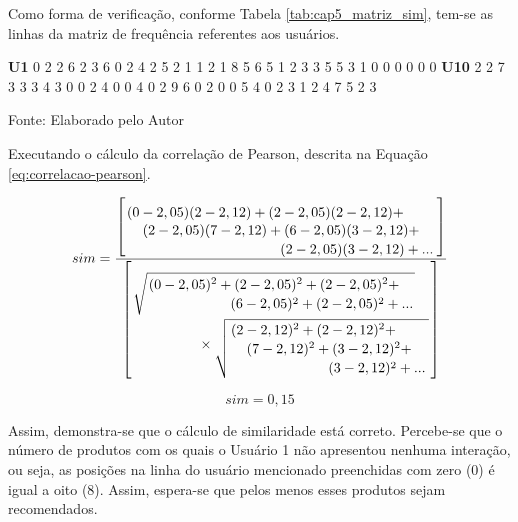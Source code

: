 
Como forma de verificação, conforme Tabela \ref{tab:cap5_matriz_sim}, tem-se as linhas da matriz de frequência referentes aos usuários.


\begin{table}[htb]
\caption{Matriz de frequências de interações}
\label{tab:cap5_matriz_sim}
\toprule
\textbf{U1} \hspace{0.23cm} 0 2  2  6  2  3  6  0  2  4  2  5  2  1  1  2  1  8  5  6  5  1  2  3  3  5  5  3  1  0  0  0  0  0  0 \vspace{0.1cm} \midrule 
\textbf{U10} \hspace{0.02cm} 2  2  7  3  3  3  4  3  0  0  2  4  0  0  4  0  2  9  6  0  2  0  0  5  4  0  2  3  1  2  4  7  5  2  3 \vspace{0.1cm}  \bottomrule \vspace{0.1cm} 

\footnotesize{Fonte: Elaborado pelo Autor}
\end{table}        

\newpage
Executando o cálculo da correlação de Pearson, descrita na Equação \ref{eq:correlacao-pearson}.

\begin{equation}
sim=\dfrac{\left[
\splitdfrac{
(0-2,05)(2-2,12)+
(2-2,05)(2-2,12)+
}
{\splitdfrac{
(2-2,05)(7-2,12)+
(6-2,05)(3-2,12)+
}{
(2-2,05)(3-2,12)+...}}\right]}
{
\left[
\splitdfrac{
\sqrt{\splitdfrac{(0-2,05)^2+
(2-2,05)^2+
(2-2,05)^2+
}{
(6-2,05)^2+
(2-2,05)^2+...}}
}{
\times\sqrt{\splitdfrac{(2-2,12)^2+
(2-2,12)^2+}{\splitdfrac{
(7-2,12)^2+
(3-2,12)^2+
}{
(3-2,12)^2+...}}}
}\right]
}
\nonumber
\end{equation}

\begin{equation}
sim = 0,15 \nonumber
\end{equation}

Assim, demonstra-se que o cálculo de similaridade está correto. Percebe-se que o número de produtos com os quais o Usuário 1 não apresentou nenhuma interação, ou seja, as posições na linha do usuário mencionado preenchidas com zero (0) é igual a oito (8). Assim, espera-se que pelos menos esses produtos sejam recomendados.

